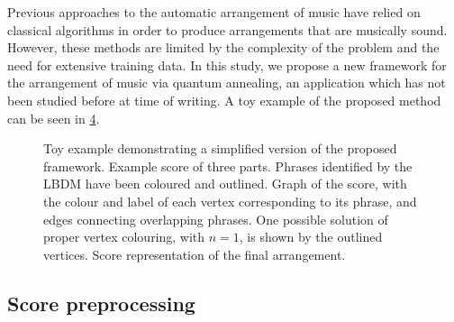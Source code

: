\documentclass[twocolumn]{article}
\theoremstyle{definition}
\begin{document}
Previous approaches to the automatic arrangement of music have relied on classical algorithms in order to produce arrangements that are musically sound. However, these methods are limited by the complexity of the problem and the need for extensive training data. In this study, we propose a new framework for the arrangement of music via quantum annealing, an application which has not been studied before at time of writing. A toy example of the proposed method can be seen in \cref{fig:toy}.

\begin{figure}[!ht]
    \centering\footnotesize
    \begin{subfigure}{\textwidth}
        \centering
        
        \caption{}
        \label{fig:toy-score}
    \end{subfigure}
    \par\bigskip
    \begin{subfigure}{\textwidth}
        \centering
        
        \caption{}
        \label{fig:toy-graph}
    \end{subfigure}
    \par\bigskip
    \begin{subfigure}{\textwidth}
        \centering
        
        \caption{}
        \label{fig:toy-arrangement}
    \end{subfigure}

    \caption{Toy example demonstrating a simplified version of the proposed framework. \textbf{} Example score of three parts. Phrases identified by the LBDM have been coloured and outlined. \textbf{} Graph of the score, with the colour and label of each vertex corresponding to its phrase, and edges connecting overlapping phrases. One possible solution of proper vertex colouring, with $n=1$, is shown by the outlined vertices. \textbf{} Score representation of the final arrangement.}
    \label{fig:toy}
\end{figure}

\subsection{Score preprocessing}
\end{document}
